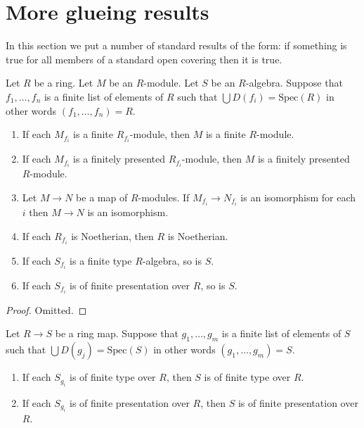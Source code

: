 \section{More glueing results}
\label{section-more-glueing}

\noindent
In this section we put a number of standard results of the
form: if something is true for all members of a standard open
covering then it is true.

\begin{lemma}
\label{lemma-cover}
Let $R$ be a ring. Let $M$ be an $R$-module. Let $S$ be an $R$-algebra.
Suppose that $f_1,\ldots,f_n$ is a finite list of
elements of $R$ such that $\bigcup D(f_i) = \text{Spec}(R)$
in other words $(f_1,\ldots,f_n) = R$.
\begin{enumerate}
\item If each $M_{f_i}$ is a finite $R_{f_i}$-module,
then $M$ is a finite $R$-module.
\item If each $M_{f_i}$ is a finitely presented $R_{f_i}$-module,
then $M$ is a finitely presented $R$-module.
\item Let $M \to N$ be a map of $R$-modules. If $M_{f_i} \to N_{f_i}$
is an isomorphism for each $i$ then $M \to N$ is an isomorphism.
\item If each $R_{f_i}$ is Noetherian, then $R$ is Noetherian.
\item If each $S_{f_i}$ is a finite type $R$-algebra, so is $S$.
\item If each $S_{f_i}$ is of finite presentation over $R$, so is $S$.
\end{enumerate}
\end{lemma}

\begin{proof}
Omitted.
\end{proof}

\begin{lemma}
\label{lemma-cover-upstairs}
Let $R \to S$ be a ring map.
Suppose that $g_1, \ldots, g_m$ is a finite list of
elements of $S$ such that $\bigcup D(g_j) = \text{Spec}(S)$
in other words $(g_1, \ldots, g_m) = S$.
\begin{enumerate}
\item If each $S_{g_i}$ is of finite type over $R$, then $S$ is
of finite type over $R$.
\item If each $S_{g_i}$ is of finite presentation over $R$,
then $S$ is of finite presentation over $R$.
\end{enumerate}
\end{lemma}

